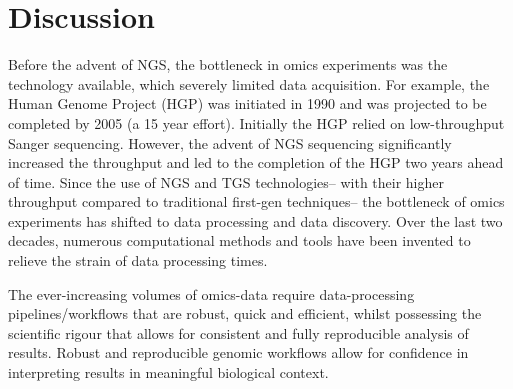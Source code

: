 %

\afterpage{\clearpage}


\section{Discussion}

Before the advent of NGS, the bottleneck in omics experiments was the technology available, which severely limited data acquisition.
For example, the Human Genome Project (HGP) was initiated in 1990 and was projected to be completed by 2005 (a 15 year effort).
Initially the HGP relied on low-throughput Sanger sequencing.
However, the advent of NGS sequencing significantly increased the throughput and led to the completion of the HGP two years ahead of time.
Since the use of NGS and TGS technologies-- with their higher throughput compared to traditional first-gen techniques-- the bottleneck of omics experiments has shifted to data processing and data discovery.
Over the last two decades, numerous computational methods and tools have been invented to relieve the strain of data processing times.

The ever-increasing volumes of omics-data require data-processing pipelines/workflows that are robust, quick and efficient, whilst possessing the scientific rigour that allows for consistent and fully reproducible analysis of results.
Robust and reproducible genomic workflows allow for confidence in interpreting results in meaningful biological context.

